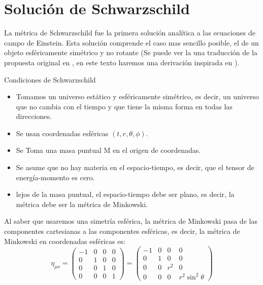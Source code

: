 \section{Solución de Schwarzschild}
\label{sec:solucionSchwarzschild}
La métrica de Schwarzschild fue la primera solución analítica a las ecuaciones de campo de Einstein. Esta solución comprende el caso mas sencillo posible, el de un objeto esféricamente simétrico y no rotante (Se puede ver la una traducción de la propuesta original en \cite{schwarzschild1999gravitationalfieldmasspoint}, en este texto haremos una derivación inspirada en \cite{eigenchris-2021}).
\begin{definition}{Condiciones de Schwarzschild}{}
    \begin{itemize}
        \item Tomamos un universo estático y esféricamente simétrico, es decir, un universo que no cambia con el tiempo y que tiene la misma forma en todas las direcciones.
        \item Se usan coordenadas esféricas $(t,r,\theta,\phi)$.
        \item Se Toma una masa puntual M en el origen de coordenadas.
        \item Se asume que no hay materia en el espacio-tiempo, es decir, que el tensor de energía-momento es cero.
        \item lejos de la masa puntual, el espacio-tiempo debe ser plano, es decir, la métrica debe ser la métrica de Minkowski.
    \end{itemize}
\end{definition}
Al saber que usaremos una simetría esférica, la métrica de Minkowski pasa de las componentes cartesianas a las componentes esféricas, es decir, la métrica de Minkowski en coordenadas esféricas es:
\begin{equation}
    \eta_{\mu \nu}=\left(\begin{array}{cccc}
            -1 & 0 & 0 & 0 \\
            0  & 1 & 0 & 0 \\
            0  & 0 & 1 & 0 \\
            0  & 0 & 0 & 1
        \end{array}\right)=\left(\begin{array}{cccc}
            -1 & 0 & 0     & 0                      \\
            0  & 1 & 0     & 0                      \\
            0  & 0 & r^{2} & 0                      \\
            0  & 0 & 0     & r^{2} \sin ^{2} \theta
        \end{array}\right)
\end{equation}

